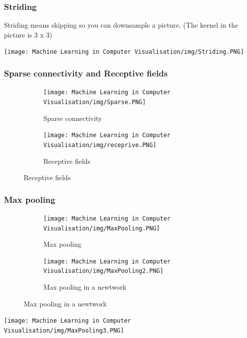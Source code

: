 \documentclass[x11names,11pt,a4paper]{article}
\theoremstyle{definition}
\begin{document}
\subsubsection{Striding}
Striding means skipping so you can downsample a picture. (The kernel in the picture is 3 x 3)
\begin{center}
	\texttt{[image: Machine Learning in Computer Visualisation/img/Striding.PNG]}
\end{center}

\subsubsection{Sparse connectivity and Receptive fields}
\begin{figure}[H]
     \centering
     \begin{subfigure}[b]{0.45\textwidth}
         \centering
         \texttt{[image: Machine Learning in Computer Visualisation/img/Sparse.PNG]}
         \caption{Sparse connectivity}
     \end{subfigure}
     \hfill
     \begin{subfigure}[b]{0.45\textwidth}
         \centering
         \texttt{[image: Machine Learning in Computer Visualisation/img/receprive.PNG]}
         \caption{Receptive fields}
     \end{subfigure}
\end{figure}

\subsubsection{Max pooling}
\begin{figure}[H]
     \centering
     \begin{subfigure}[b]{0.45\textwidth}
         \centering
         \texttt{[image: Machine Learning in Computer Visualisation/img/MaxPooling.PNG]}
         \caption{Max pooling}
     \end{subfigure}
     \hfill
     \begin{subfigure}[b]{0.45\textwidth}
         \centering
         \texttt{[image: Machine Learning in Computer Visualisation/img/MaxPooling2.PNG]}
         \caption{Max pooling in a newtwork}
     \end{subfigure}
\end{figure}

\begin{center}
	\texttt{[image: Machine Learning in Computer Visualisation/img/MaxPooling3.PNG]}
\end{center}
\end{document}
